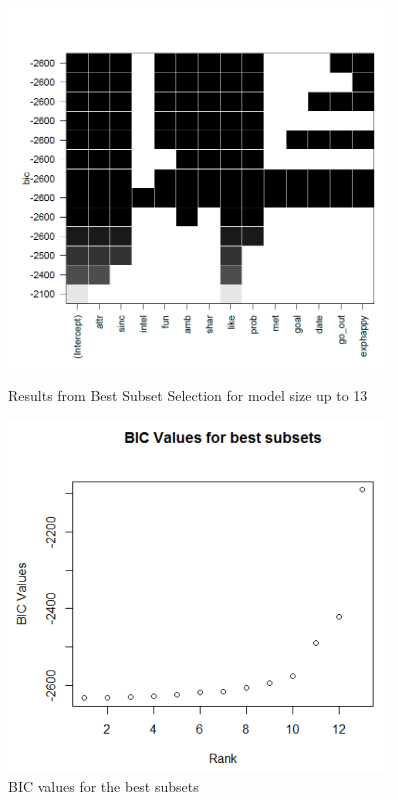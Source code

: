 \documentclass{article}
\begin{document}
\begin{figure}[H]
	\centering
	\begin{minipage}{0.45\textwidth}
		\centering
		\includegraphics[width=0.9\textwidth]{bestsubsets} %
		\caption{Results from Best Subset Selection for model size up to 13}
		\label{fig:bestsubsets}
	\end{minipage}\hfill
	\begin{minipage}{0.45\textwidth}
		\centering
		\includegraphics[width=0.9\textwidth]{BIC_sort} %
		\caption{BIC values for the best subsets}
		\label{fig:BICsort}
	\end{minipage}
\end{figure}
\end{document}
